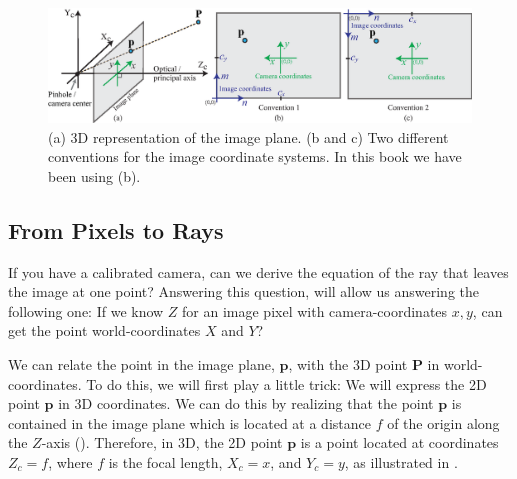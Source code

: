 \begin{figure}[t]
\centerline{
\includegraphics[width=1\linewidth]{figures/imaging_geometry/conventions_coordinates.eps}
}
\caption{(a) 3D representation of the image plane. 
(b and c) Two different conventions for the image coordinate systems. In this book we have been using (b).}
\label{fig:conventions}
\end{figure}


\subsection{From Pixels to Rays}
\label{sec:pixel_to_rays}

If you have a calibrated camera, can we derive the equation of the ray that leaves the image at one point? Answering this question, will allow us answering the following one: If we know $Z$ for an image pixel with camera-coordinates $x,y$, can get the point world-coordinates $X$ and $Y$? 

We can relate the point in the image plane, $\mathbf{p}$, with the 3D point $\mathbf{P}$ in world-coordinates. To do this, we will first play a little trick: We will express the 2D point $\mathbf{p}$ in 3D coordinates. We can do this by realizing that the point $\mathbf{p}$ is contained in the image plane which is located at a distance $f$ of the origin along the $Z$-axis (\fig{\ref{fig:coordinate_systems_ray}}).
Therefore, in 3D, the 2D point $\mathbf{p}$ is a point located at coordinates $Z_c=f$, where $f$ is the focal length, $X_c=x$, and $Y_c=y$, as illustrated in \fig{\ref{fig:coordinate_systems_ray}}.


